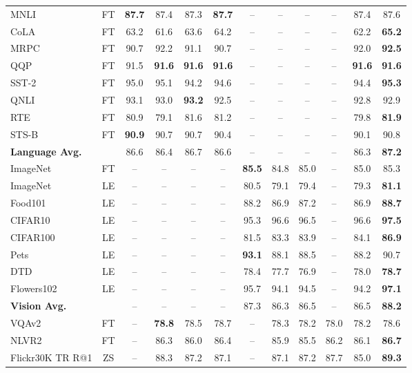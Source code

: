 \documentclass[11pt]{article}
\begin{document}
\begin{table*}[t]
{\begin{tabular}{lc|c|ccc|ccc|ccc}
\midrule 
MNLI & FT & {\bf 87.7} & 87.4 & 87.3 & {\bf 87.7} & -- & -- & -- & -- & 87.4 & 87.6 \\
CoLA & FT & 63.2 & 61.6 & 63.6 & 64.2  & -- & -- & -- & -- & 62.2 & {\bf 65.2} \\
MRPC & FT & 90.7 & 92.2 & 91.1 & 90.7  & -- & -- & -- & -- & 92.0 & {\bf 92.5} \\
QQP & FT & 91.5 & {\bf 91.6} & {\bf 91.6} & {\bf 91.6}  & -- & -- & -- & -- & {\bf 91.6} & {\bf 91.6} \\
SST-2 & FT & 95.0 & 95.1 & 94.2 & 94.6  & -- & -- & -- & -- & 94.4 & {\bf 95.3} \\
QNLI & FT & 93.1 & 93.0 & {\bf 93.2} & 92.5  & -- & -- & -- & -- & 92.8 & 92.9  \\
RTE & FT & 80.9 & 79.1 & 81.6 & 81.2  & -- & -- & -- & -- & 79.8 & {\bf 81.9} \\
STS-B & FT & {\bf 90.9} & 90.7 & 90.7 & 90.4  & -- & -- & -- & -- & 90.1 & 90.8 \\
\midrule 
\textbf{Language Avg.} &  & 86.6 & 86.4 & 86.7 & 86.6  & -- & -- & -- & -- & 86.3 & {\bf 87.2} \\
\midrule 
ImageNet & FT & -- & -- & -- & --  & {\bf 85.5} & 84.8 & 85.0 & -- & 85.0 & 85.3 \\
ImageNet & LE & -- & -- & -- &  --  & 80.5 & 79.1 & 79.4 & -- & 79.3 & {\bf 81.1} \\
Food101 & LE & -- & -- & -- & -- & 88.2 & 86.9 & 87.2 & -- & 86.9 & {\bf 88.7}\\
CIFAR10 & LE & -- & -- & -- & -- & 95.3 & 96.6 & 96.5 & -- & 96.6 & {\bf 97.5} \\
CIFAR100 & LE & -- & -- & -- & -- & 81.5 & 83.3 & 83.9 & -- & 84.1 & {\bf 86.9} \\
Pets & LE & -- & -- & -- & -- & {\bf 93.1} & 88.1 & 88.5 & -- & 88.2 & 90.7 \\
DTD & LE & -- & -- & -- & -- & 78.4 & 77.7 & 76.9 & -- & 78.0 & {\bf 78.7} \\
Flowers102 & LE & -- & -- & -- & -- & 95.7 & 94.1 & 94.5 & -- & 94.2 & {\bf 97.1}  \\
\midrule 
\textbf{Vision Avg.} & & -- & -- & -- & -- & 87.3 & 86.3 & 86.5 & -- & 86.5 & {\bf 88.2} \\
\midrule
VQAv2 & FT & -- & {\bf 78.8} & 78.5 & 78.7 & -- & 78.3 & 78.2 & 78.0 & 78.2 & 78.6 \\
NLVR2 & FT & -- & 86.3 & 86.0 & 86.4 & -- & 85.9 & 85.5 & 86.2 & 86.1 & {\bf 86.7} \\
Flickr30K TR R@1 & ZS & -- & 88.3 & 87.2 & 87.1 & -- & 87.1 & 87.2 & 87.7 & 85.0 &  {\bf 89.3} \\

\end{tabular}}
\end{table*}
\end{document}

